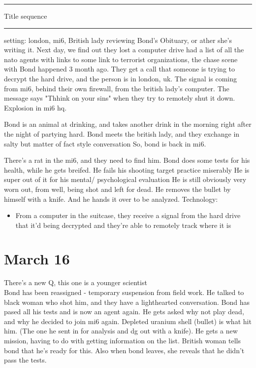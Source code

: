\documentclass{article}
\begin{document}
  \noindent\rule{\textwidth}{1pt}
  Title sequence\\
  \noindent\rule{\textwidth}{1pt}

  setting: london, mi6, British lady reviewing Bond's Obituary, or ather she's writing it.
  Next day, we find out they lost a computer drive had a list of all the nato agents with links to
  some link to terrorist organizations, the chase scene with Bond happened 3 month ago.
  They get a call that someone is trying to decrypt the hard drive, and the person is in london, uk.
The signal is coming from mi6, behind their own firewall, from the british lady's computer.
The message says "Thhink on your sins" when they try to remotely shut it down.
Explosion in mi6 hq.

Bond is an animal at drinking, and takes another drink in the morning right after
the night of partying hard.
Bond meets the british lady, and they exchange in salty but matter of fact style conversation
So, bond is back in mi6.

There's a rat in the mi6, and they need to find him.
Bond does some tests for his health, while he gets breifed.
He fails his shooting target practice miserably
He is super out of it for his mental/ psychological evaluation
He is still obviously very worn out, from well, being shot and left for dead.
He removes the bullet by himself with a knife.
And he hands it over to be analyzed.
  Technology:
  \begin{itemize}
    \item From a computer in the suitcase, they receive a signal from the hard drive that it'd being decrypted
    and they're able to remotely track where it is

  \end{itemize}

  \section{March 16}
    There's a new Q, this one is a younger scientist\\
    Bond has been reassigned - temporary suspension from field work.
    He talked to black woman who shot him, and they have a lighthearted conversation.
    Bond has pased all his tests and is now an agent again.
    He gets asked why not play dead, and why he decided to join mi6 again.
    Depleted uranium shell (bullet) is what hit him. (The one he sent in for analysis
    and dg out with a knife). He gets a new mission, having to do with getting information
    on the list. British woman tells bond that he's ready for this. Also when bond leaves,
    she reveals that he didn't pass the tests.
\end{document}
